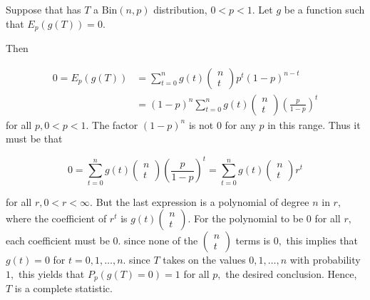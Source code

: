 \documentclass[ 11pt,%
				a4paper,%
				twoside,%
				headinclude,%
				footinclude = true,%
				cleardoublepage = empty,%
				reqno]{scrbook}
\begin{document}
\begin{example}

Suppose that has $T$ a $\text{Bin}(n, p)$ distribution, $0 < p < 1$. Let $g$ be a function such that $E_{p} (g(T))=0$.

Then

\[
\begin{aligned}
0=E_{p} (g(T)) &=\sum_{t=0}^{n} g(t)\left(\begin{array}{c}
n \\
t
\end{array}\right) p^{t}(1-p)^{n-t} \\
&=(1-p)^{n} \sum_{t=0}^{n} g(t)\left(\begin{array}{c}
n \\
t
\end{array}\right)\left(\frac{p}{1-p}\right)^{t}
\end{aligned}
\]
for all $p, 0<p<1$. The factor $(1-p)^{n}$ is not 0 for any $p$ in this range. Thus it must be that

\[
0=\sum_{t=0}^{n} g(t)\left(\begin{array}{c}
n \\
t
\end{array}\right)\left(\frac{p}{1-p}\right)^{t}=\sum_{t=0}^{n} g(t)\left(\begin{array}{c}
n \\
t
\end{array}\right) r^{t}
\]

for all $r, 0<r<\infty .$ But the last expression is a polynomial of degree $n$ in $r,$ where the coefficient of $r^{t}$ is $g(t)\left(\begin{array}{c}n \\ t\end{array}\right) .$ For the polynomial to be 0 for all $r,$ each coefficient must be
0. since none of the $\left(\begin{array}{c}n \\ t\end{array}\right)$ terms is $0,$ this implies that $g(t)=0$ for $t=0,1, \ldots, n .$ since $T$ takes on the values $0,1, \ldots, n$ with probability $1,$ this yields that $P_{p}(g(T)=0)=1$ for all $p,$ the desired conclusion. Hence, $T$ is a complete statistic.
\end{example}
\end{document}

